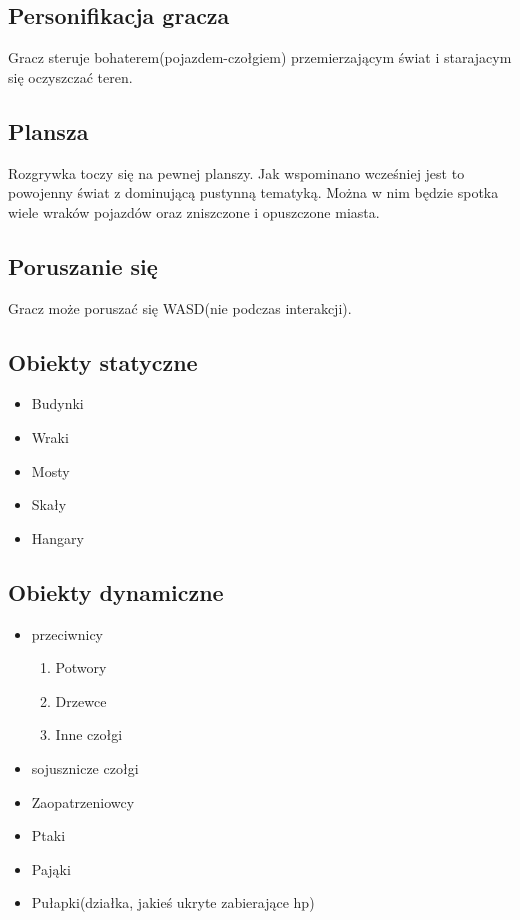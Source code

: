 \documentclass{article}
\begin{document}
    \subsection{Personifikacja gracza}
    Gracz steruje bohaterem(pojazdem-czołgiem) przemierzającym świat i starajacym się oczyszczać teren.
    \subsection{Plansza}
    Rozgrywka toczy się na pewnej planszy. Jak wspominano wcześniej jest to powojenny świat z dominującą pustynną tematyką. Można w nim będzie spotka wiele wraków pojazdów oraz zniszczone i opuszczone miasta.
    \subsection{Poruszanie się}
    Gracz może poruszać się WASD(nie podczas interakcji).
    \subsection{Obiekty statyczne}
    \begin{itemize}
        \item Budynki
        \item Wraki
        \item Mosty
        \item Skały
        \item Hangary
        
    \end{itemize}
    \subsection{Obiekty dynamiczne}
    \begin{itemize}
        \item przeciwnicy
        \begin{enumerate}
            \item Potwory
            \item Drzewce
            \item Inne czołgi
        \end{enumerate}
        \item sojusznicze czołgi
        \item Zaopatrzeniowcy
        \item Ptaki
        \item Pająki
        \item Pułapki(działka, jakieś ukryte zabierające hp)
        
    \end{itemize}
\end{document}
